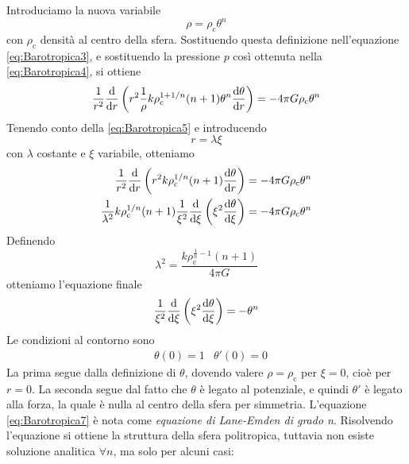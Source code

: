 Introduciamo la nuova variabile
\begin{equation}
\rho = \rho_\mathrm{c} \theta^n \label{eq:Barotropica5}
\end{equation}
con $\rho_\mathrm{c}$ densità al centro della sfera. Sostituendo questa definizione nell'equazione \ref{eq:Barotropica3}, e sostituendo la pressione $p$ così ottenuta nella \ref{eq:Barotropica4}, si ottiene
\begin{equation}
\frac{1}{r^2}\dfrac{\mathrm{d} {}}{\mathrm{d} {r}} \left( r^2 \frac{1}{\rho} k \rho_\mathrm{c}^{1+1/n}(n+1)\theta^n \dfrac{\mathrm{d} {\theta}}{\mathrm{d} {r}} \right) = -4\pi G \rho_\mathrm{c}\theta^n
\end{equation}
Tenendo conto della \ref{eq:Barotropica5} e introducendo
\begin{equation}
r=\lambda \xi
\end{equation}
con $\lambda$ costante e $\xi$ variabile, otteniamo
\begin{align*}
\frac{1}{r^2}\dfrac{\mathrm{d} {}}{\mathrm{d} {r}} \left( r^2  k \rho_\mathrm{c}^{1/n}(n+1) \dfrac{\mathrm{d} {\theta}}{\mathrm{d} {r}} \right) & = -4\pi G \rho_\mathrm{c}\theta^n \\
\frac{1}{\lambda^2}k \rho_\mathrm{c}^{1/n} (n+1) \frac{1}{\xi^2} \dfrac{\mathrm{d} {}}{\mathrm{d} {\xi}} \left( \xi^2 \dfrac{\mathrm{d} {\theta}}{\mathrm{d} {\xi}} \right) &= -4\pi G \rho_\mathrm{c}\theta^n
\end{align*}
Definendo
\begin{equation}
\lambda^2 = \frac{k \rho_\mathrm{c}^{\frac{1}{n} -1} (n+1)}{4\pi G} \label{eq:Barotropica6}
\end{equation}
otteniamo l'equazione finale
\begin{equation}
\frac{1}{\xi^2}\dfrac{\mathrm{d} {}}{\mathrm{d} {\xi}} \left( \xi^2 \dfrac{\mathrm{d} {\theta}}{\mathrm{d} {\xi}} \right) = -\theta^n  \label{eq:Barotropica7}
\end{equation}
Le condizioni al contorno sono
\begin{align*}
& \theta(0) =1
& \theta'(0) =0
\end{align*}
La prima segue dalla definizione di $\theta$, dovendo valere $\rho = \rho_\mathrm{c}$ per $\xi=0$, cioè per $r=0$. La seconda segue dal fatto che $\theta$ è legato al potenziale, e quindi $\theta'$ è legato alla forza, la quale è nulla al centro della sfera per simmetria. L'equazione \ref{eq:Barotropica7} è nota come \textit{equazione di Lane-Emden di grado n}. Risolvendo l'equazione si ottiene la struttura della sfera politropica, tuttavia non esiste soluzione analitica $\forall n$, ma solo per alcuni casi:
